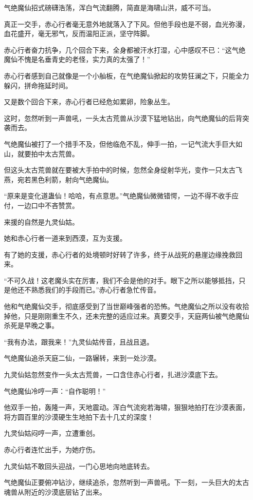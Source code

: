 \begin{this_body}
气绝魔仙招式磅礴浩荡，浑白气流翻腾，简直是海啸山洪，威不可当。

真正一交手，赤心行者毫无意外地就落入了下风。但他手段也是不弱，血光弥漫，血花盛开，毫无邪气，反而温阳正派，坚守阵脚。

赤心行者奋力抗争，几个回合下来，全身都被汗水打湿，心中感叹不已：“这气绝魔仙不愧是名垂青史的老怪，实力真的太强了！”

赤心行者感到自己就像是一个小舢板，在气绝魔仙掀起的攻势狂澜之下，只能全力躲闪，拼命拖延时间。

又是数个回合下来，赤心行者已经危如累卵，险象丛生。

这时，忽然听到一声兽吼，一头太古荒兽从沙漠下猛地钻出，向气绝魔仙的后背突袭而去。

气绝魔仙被打了一个措手不及，但他临危不乱，伸手一拍，一记气流大手巨大如山，就要拍中太古荒兽。

但这头太古荒兽就在要被大手拍中的时候，忽然全身绽射华光，变作一只太古飞燕，宛若黑色利箭，射向气绝魔仙。

“原来是变化道蛊仙！哈哈，有点意思。”气绝魔仙微微错愕，一边不得不收手应付，一边口中不吝赞赏。

来援的自然是九灵仙姑。

她和赤心行者一道来到西漠，互为支援。

有了她的支援，赤心行者的处境顿时好转了许多，终于从战死的悬崖边缘挽救回来。

“不可久战！这老魔头实在厉害，我们不会是他的对手。眼下之所以能够抵挡，只是他还不熟悉我们的手段而已。”赤心行者急忙传音。

他和气绝魔仙交手，彻底感受到了当世巅峰强者的恐怖。气绝魔仙之所以没有收拾掉他，只是刚刚重生不久，还未完整的适应过来。真要交手，天庭两仙被气绝魔仙杀死是早晚之事。

“我有办法，跟我来！”九灵仙姑传音，且战且退。

气绝魔仙追杀天庭二仙，一路辗转，来到一处沙漠。

九灵仙姑忽然变作一头太古荒兽，一口含住赤心行者，扎进沙漠底下去。

气绝魔仙冷哼一声：“自作聪明！”

他双手一拍，轰隆一声，天地震动。浑白气流宛若海啸，狠狠地拍打在沙漠表面，将方圆百里的沙漠硬生生地拍下去十几丈的深度！

九灵仙姑闷哼一声，立遭重创。

赤心行者连忙出手，为她疗伤。

九灵仙姑不敢回头迎战，一门心思地向地底转去。

气绝魔仙正要俯冲钻沙，继续追杀，忽然听到一声兽吼。下一刻，一头巨大的太古魂兽从附近的沙漠底层钻了出来。


\end{this_body}
